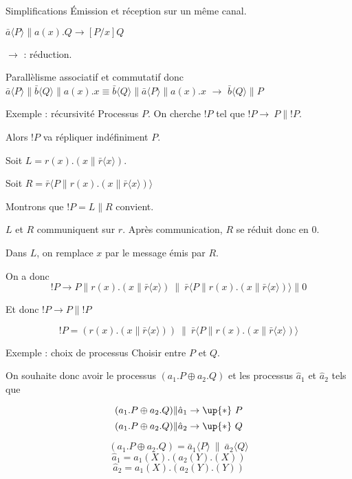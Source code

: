 \documentclass{beamer}
\def\+{\oplus}
\begin{document}
\begin{frame}{Simplifications}
Émission et réception sur un même canal.

$\bar{a}\langle P\rangle\|a(x).Q \rightarrow [P/x]Q$

$\rightarrow$ : réduction.

Parallèlisme associatif et commutatif donc 
$\bar{a}\langle P\rangle\|\bar{b}\langle Q\rangle\|a(x).x \equiv  \bar{b}\langle Q\rangle\|\bar{a}\langle P\rangle\|a(x).x$ $\rightarrow$ $\bar{b}\langle Q\rangle\|P$
\end{frame}

\begin{frame}{Exemple : récursivité}
Processus $P$. On cherche $!P$ tel que $!P\rightarrow\ P\|!P$.

Alors $!P$ va répliquer indéfiniment $P$.


Soit $L = r(x).(x\|\bar{r}\langle x\rangle)$.

Soit $R = \bar{r}\langle P\|r(x).(x\|\bar{r}\langle x\rangle)\rangle$

Montrons que $!P = L\|R$ convient.

$L$ et $R$ communiquent sur $r$. Après communication, $R$ se réduit donc en $0$.

Dans $L$, on remplace $x$ par le message émis par $R$.


On a donc $$!P\rightarrow P\|r(x).(x\|\bar{r}\langle x\rangle)\ \|\ \bar{r}\langle P\|r(x).(x\|\bar{r}\langle x\rangle)\rangle\| 0$$

Et donc $!P\rightarrow P\|!P$
\begin{alertblock}{}
 $$!P = (r(x).(x\|\bar{r}\langle x\rangle))\ \|\ \bar{r}\langle P\|r(x).(x\|\bar{r}\langle x\rangle)\rangle$$
\end{alertblock}
\end{frame}

\begin{frame}{Exemple : choix de processus}
Choisir entre $P$ et $Q$.

On souhaite donc avoir le processus  $(a_1.P\+ a_2.Q)$ et les processus $\hat{a}_1$ et $\hat{a}_2$ tels que

$$(a_1.P\+ a_2.Q)\|\hat{a}_1\rightarrow\up{*}\ P$$
$$(a_1.P\+ a_2.Q)\|\hat{a}_2\rightarrow\up{*}\ Q$$

\begin{alertblock}{}
$$(a_1.P\+ a_2.Q) = \bar{a}_1\langle P\rangle\ \|\ \bar{a}_2\langle Q\rangle$$
$$\hat{a}_1 = a_1(X).(a_2(Y).(X))$$
$$\hat{a}_2 = a_1(X).(a_2(Y).(Y))$$
\end{alertblock}
\end{frame}
\end{document}
